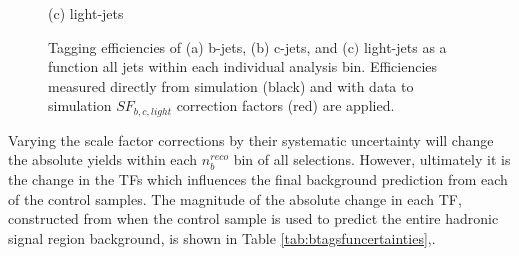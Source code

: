 \begin{figure}[ht]
\begin{minipage}[b]{0.48\linewidth}
\centering (c) light-jets
\end{minipage}
\caption[Tagging efficiencies of (a) b-jets, (b) c-jets, and (c$)$ light-jets determined from all jets within each individual analysis \theht bin. ]{Tagging efficiencies of (a) b-jets, (b) c-jets, and (c$)$ light-jets as a function all jets within each individual analysis \theht bin. Efficiencies measured directly from simulation (black) and with data to simulation $SF_{b,c,light}$ correction factors (red) are applied.}\label{fig:btagefficiency}
\end{figure}



Varying the scale factor corrections by their systematic uncertainty will change the absolute yields within  each $n_{b}^{reco}$ bin of all selections. However, ultimately it is the change in the \ac{TF}s which influences the final background prediction from each of the control samples. The magnitude of the absolute change in each \ac{TF}, constructed from when the \mupjets control sample is used to predict the entire hadronic signal region background, is shown in Table \ref{tab:btagsfuncertainties},. 

